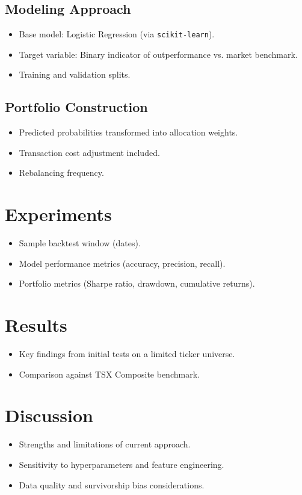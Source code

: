 \documentclass[11pt]{article}
\begin{document}
\subsection{Modeling Approach}
\begin{itemize}
    \item Base model: Logistic Regression (via \texttt{scikit-learn}).
    \item Target variable: Binary indicator of outperformance vs. market benchmark.
    \item Training and validation splits.
\end{itemize}

\subsection{Portfolio Construction}
\begin{itemize}
    \item Predicted probabilities transformed into allocation weights.
    \item Transaction cost adjustment included.
    \item Rebalancing frequency.
\end{itemize}

\section{Experiments}
\begin{itemize}
    \item Sample backtest window (dates).
    \item Model performance metrics (accuracy, precision, recall).
    \item Portfolio metrics (Sharpe ratio, drawdown, cumulative returns).
\end{itemize}

\section{Results}
\begin{itemize}
    \item Key findings from initial tests on a limited ticker universe.
    \item Comparison against TSX Composite benchmark.
\end{itemize}

\section{Discussion}
\begin{itemize}
    \item Strengths and limitations of current approach.
    \item Sensitivity to hyperparameters and feature engineering.
    \item Data quality and survivorship bias considerations.
\end{itemize}
\end{document}
